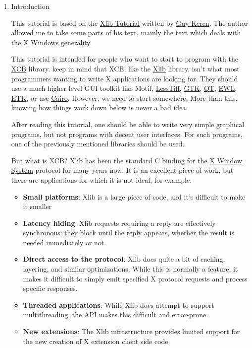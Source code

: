 \documentclass[12pt,oneside,titlepage]{book}
\providecommand{\tightlist}{%
  \setlength{\itemsep}{0pt}\setlength{\parskip}{0pt}}
\begin{document}
\begin{enumerate}
\item
  \protect\hypertarget{intro}{}{Introduction}

  This tutorial is based on the
  \href{http://users.actcom.co.il/~choo/lupg/tutorials/xlib-programming/xlib-programming.html}{Xlib
  Tutorial} written by
  \href{mailto:choor\%20at\%20atcom\%20dot\%20co\%20dot\%20il}{Guy
  Keren}. The author allowed me to take some parts of his text, mainly
  the text which deals with the X Windows generality.

  This tutorial is intended for people who want to start to program with
  the \href{http://xcb.freedesktop.org}{XCB} library. keep in mind that
  XCB, like the \href{http://tronche.com/gui/x/xlib/introduction}{Xlib}
  library, isn't what most programmers wanting to write X applications
  are looking for. They should use a much higher level GUI toolkit like
  Motif, \href{http://www.lesstif.org}{LessTiff},
  \href{http://www.gtk.org}{GTK}, \href{http://www.trolltech.com}{QT},
  \href{http://www.enlightenment.org}{EWL},
  \href{http://www.enlightenment.org}{ETK}, or use
  \href{http://cairographics.org}{Cairo}. However, we need to start
  somewhere. More than this, knowing how things work down below is never
  a bad idea.

  After reading this tutorial, one should be able to write very simple
  graphical programs, but not programs with decent user interfaces. For
  such programs, one of the previously mentioned libraries should be
  used.

  But what is XCB? Xlib has been the standard C binding for the
  \href{http://www.x.org}{X Window System} protocol for many years now.
  It is an excellent piece of work, but there are applications for which
  it is not ideal, for example:

  \begin{itemize}
  \tightlist
  \item
    \textbf{Small platforms}: Xlib is a large piece of code, and it's
    difficult to make it smaller
  \item
    \textbf{Latency hiding}: Xlib requests requiring a reply are
    effectively synchronous: they block until the reply appears, whether
    the result is needed immediately or not.
  \item
    \textbf{Direct access to the protocol}: Xlib does quite a bit of
    caching, layering, and similar optimizations. While this is normally
    a feature, it makes it difficult to simply emit specified X protocol
    requests and process specific responses.
  \item
    \textbf{Threaded applications}: While Xlib does attempt to support
    multithreading, the API makes this difficult and error-prone.
  \item
    \textbf{New extensions}: The Xlib infrastructure provides limited
    support for the new creation of X extension client side code.
  \end{itemize}


\end{enumerate}
\end{document}
